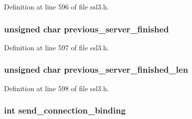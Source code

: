 Definition at line 596 of file ssl3.\+h.

\subsubsection[{\texorpdfstring{previous\+\_\+server\+\_\+finished}{previous_server_finished}}]{\setlength{\rightskip}{0pt plus 5cm}unsigned char previous\+\_\+server\+\_\+finished}\hypertarget{structssl3__state__st_a43c363a680d09c8a097dd0ceec893738}{}\label{structssl3__state__st_a43c363a680d09c8a097dd0ceec893738}


Definition at line 597 of file ssl3.\+h.

\subsubsection[{\texorpdfstring{previous\+\_\+server\+\_\+finished\+\_\+len}{previous_server_finished_len}}]{\setlength{\rightskip}{0pt plus 5cm}unsigned char previous\+\_\+server\+\_\+finished\+\_\+len}\hypertarget{structssl3__state__st_a89d3bf5f1a06eda9ce57fe299d7cb1a9}{}\label{structssl3__state__st_a89d3bf5f1a06eda9ce57fe299d7cb1a9}


Definition at line 598 of file ssl3.\+h.

\subsubsection[{\texorpdfstring{send\+\_\+connection\+\_\+binding}{send_connection_binding}}]{\setlength{\rightskip}{0pt plus 5cm}int send\+\_\+connection\+\_\+binding}\hypertarget{structssl3__state__st_a30cf04ba88eb33c273427d5d0eca84f5}{}\label{structssl3__state__st_a30cf04ba88eb33c273427d5d0eca84f5}


